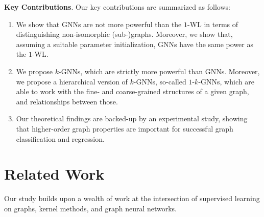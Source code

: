 \documentclass[letterpaper]{article}
\theoremstyle{definition}
\newcommand{\xhdr}[1]{{\noindent\bfseries #1}.}
\begin{document}
\xhdr{Key Contributions}
Our key contributions are summarized as follows:
\begin{enumerate}
	\item We show that GNNs are not more powerful than the $1$-WL in terms of distinguishing non-isomorphic (sub-)graphs. Moreover, we show that, assuming a suitable parameter initialization, GNNs have the same power as the $1$-WL.
	\item We propose $k$-GNNs, which are strictly more powerful than GNNs. Moreover, we propose a hierarchical version of $k$-GNNs, so-called $1$-$k$-GNNs, which are able to work with the fine- and coarse-grained structures of a given graph, and relationships between those. 
	\item Our theoretical findings are backed-up by an experimental study, showing that higher-order graph properties are important for successful graph classification and regression.
\end{enumerate}

\section{Related Work}
Our study builds upon a wealth of work at the intersection of supervised learning on graphs, kernel methods, and graph neural networks. 
\end{document}
